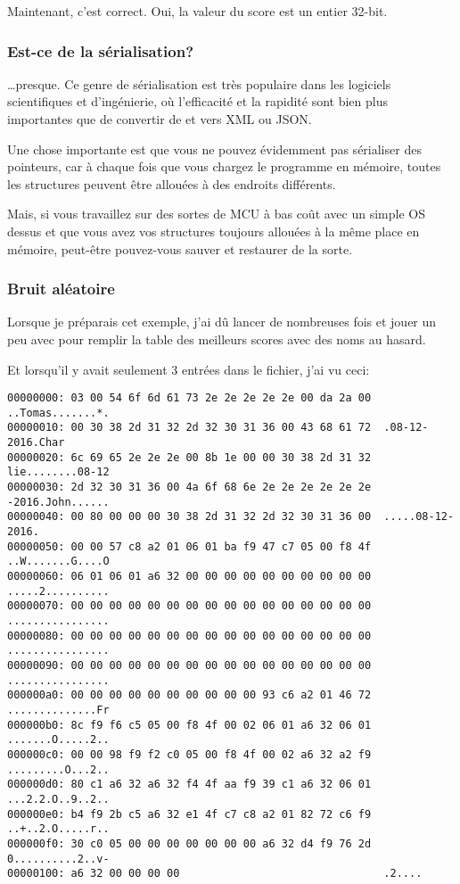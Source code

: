 Maintenant, c'est correct. Oui, la valeur du score est un entier 32-bit.

\subsubsection{Est-ce de la sérialisation?}

\dots presque.
Ce genre de sérialisation est très populaire dans les logiciels scientifiques et
d'ingénierie, où l'efficacité et la rapidité sont bien plus importantes que de convertir
de et vers \ac{XML} ou \ac{JSON}.

Une chose importante est que vous ne pouvez évidemment pas sérialiser des pointeurs,
car à chaque fois que vous chargez le programme en mémoire, toutes les structures
peuvent être allouées à des endroits différents.

Mais, si vous travaillez sur des sortes de \ac{MCU} à bas coût avec un simple \ac{OS}
dessus et que vous avez vos structures toujours allouées à la même place en mémoire,
peut-être pouvez-vous sauver et restaurer de la sorte.

\subsubsection{Bruit aléatoire}

Lorsque je préparais cet exemple, j'ai dû lancer  de nombreuses fois
et jouer un peu avec pour remplir la table des meilleurs scores avec des noms au
hasard.

Et lorsqu'il y avait seulement 3 entrées dans le fichier, j'ai vu ceci:

\begin{lstlisting}
00000000: 03 00 54 6f 6d 61 73 2e 2e 2e 2e 2e 00 da 2a 00  ..Tomas.......*.
00000010: 00 30 38 2d 31 32 2d 32 30 31 36 00 43 68 61 72  .08-12-2016.Char
00000020: 6c 69 65 2e 2e 2e 00 8b 1e 00 00 30 38 2d 31 32  lie........08-12
00000030: 2d 32 30 31 36 00 4a 6f 68 6e 2e 2e 2e 2e 2e 2e  -2016.John......
00000040: 00 80 00 00 00 30 38 2d 31 32 2d 32 30 31 36 00  .....08-12-2016.
00000050: 00 00 57 c8 a2 01 06 01 ba f9 47 c7 05 00 f8 4f  ..W.......G....O
00000060: 06 01 06 01 a6 32 00 00 00 00 00 00 00 00 00 00  .....2..........
00000070: 00 00 00 00 00 00 00 00 00 00 00 00 00 00 00 00  ................
00000080: 00 00 00 00 00 00 00 00 00 00 00 00 00 00 00 00  ................
00000090: 00 00 00 00 00 00 00 00 00 00 00 00 00 00 00 00  ................
000000a0: 00 00 00 00 00 00 00 00 00 00 93 c6 a2 01 46 72  ..............Fr
000000b0: 8c f9 f6 c5 05 00 f8 4f 00 02 06 01 a6 32 06 01  .......O.....2..
000000c0: 00 00 98 f9 f2 c0 05 00 f8 4f 00 02 a6 32 a2 f9  .........O...2..
000000d0: 80 c1 a6 32 a6 32 f4 4f aa f9 39 c1 a6 32 06 01  ...2.2.O..9..2..
000000e0: b4 f9 2b c5 a6 32 e1 4f c7 c8 a2 01 82 72 c6 f9  ..+..2.O.....r..
000000f0: 30 c0 05 00 00 00 00 00 00 00 a6 32 d4 f9 76 2d  0..........2..v-
00000100: a6 32 00 00 00 00                                .2....
\end{lstlisting}

